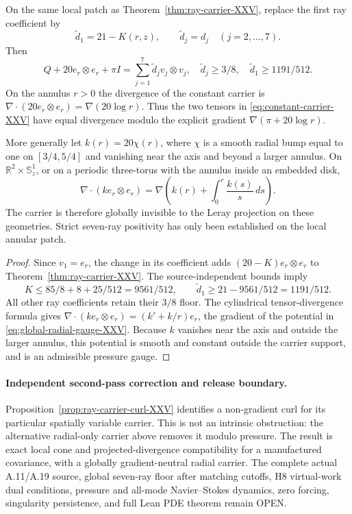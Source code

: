 \begin{theorem}
\label{thm:constant-carrier-XXV}
On the same local patch as Theorem~\ref{thm:ray-carrier-XXV},
replace the first ray coefficient by
\[
\widetilde d_1=21-K(r,z),\qquad
\widetilde d_j=d_j\quad (j=2,\ldots,7).
\]
Then
\begin{equation}\label{eq:constant-carrier-XXV}
\boxed{Q+20 e_r\otimes e_r+\pi I
=\sum_{j=1}^7\widetilde d_jv_j\otimes v_j,
\quad \widetilde d_j\ge3/8,\quad
\widetilde d_1\ge1191/512.}
\end{equation}
On the annulus $r>0$ the divergence of the constant carrier is
$\nabla\cdot(20e_r\otimes e_r)=\nabla(20\log r)$.
Thus the two tensors in \eqref{eq:constant-carrier-XXV}
have equal divergence modulo the explicit gradient
$\nabla(\pi+20\log r)$.

More generally let $k(r)=20\chi(r)$, where $\chi$ is a
smooth radial bump equal to one on $[3/4,5/4]$ and
vanishing near the axis and beyond a larger annulus.
On $\mathbb R^2\times\mathbb S^1_z$, or on a periodic
three-torus with the annulus inside an embedded disk,
\begin{equation}\label{eq:global-radial-gauge-XXV}
\boxed{\nabla\cdot(k e_r\otimes e_r)=
\nabla\left(k(r)+\int_0^r\frac{k(s)}s\,ds\right).}
\end{equation}
The carrier is therefore globally invisible to the Leray
projection on these geometries. Strict seven-ray positivity
has only been established on the local annular patch.
\end{theorem}
\begin{proof}
Since $v_1=e_r$, the change in its coefficient adds
$(20-K)e_r\otimes e_r$ to
Theorem~\ref{thm:ray-carrier-XXV}.
The source-independent bounds imply
\[
K\le85/8+8+25/512=9561/512,\qquad
\widetilde d_1\ge21-9561/512=1191/512.
\]
All other ray coefficients retain their $3/8$ floor.
The cylindrical tensor-divergence formula gives
$\nabla\cdot(k e_r\otimes e_r)=(k'+k/r)e_r$,
the gradient of the potential in
\eqref{eq:global-radial-gauge-XXV}.
Because $k$ vanishes near the axis and outside the larger
annulus, this potential is smooth and constant outside the
carrier support, and is an admissible pressure gauge.
\end{proof}

\paragraph{Independent second-pass correction and release boundary.}
Proposition~\ref{prop:ray-carrier-curl-XXV} identifies a non-gradient
curl for its particular spatially variable carrier. This
is not an intrinsic obstruction: the alternative radial-only
carrier above removes it modulo pressure. The result is exact
local cone and projected-divergence compatibility for a
manufactured covariance, with a globally gradient-neutral
radial carrier. The complete actual A.11/A.19 source,
global seven-ray floor after matching cutoffs,
H8 virtual-work dual conditions, pressure and all-mode
Navier--Stokes dynamics, zero forcing, singularity
persistence, and full Lean PDE theorem remain OPEN.
